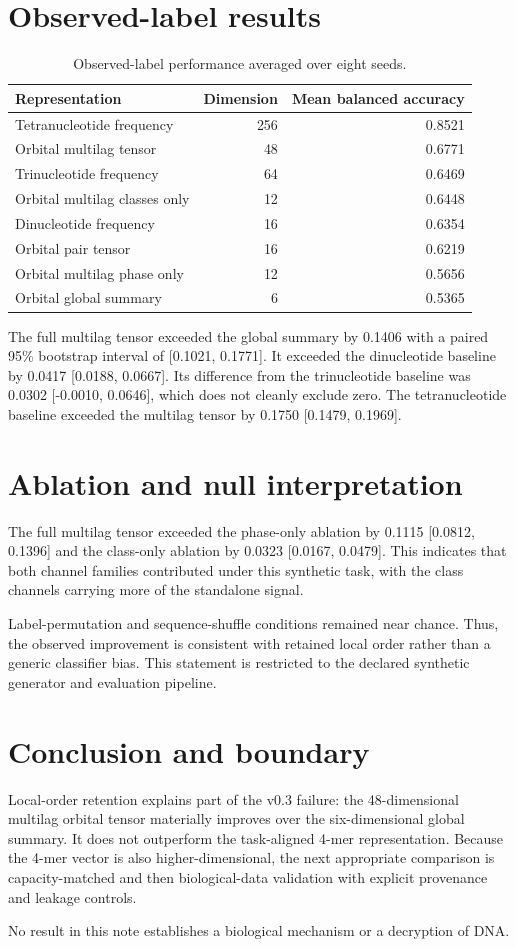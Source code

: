 \documentclass[11pt]{article}
\begin{document}
\section{Observed-label results}
\begin{table}[ht]
\centering
\begin{tabular}{lrr}
\toprule
Representation & Dimension & Mean balanced accuracy \\
\midrule
Tetranucleotide frequency & 256 & 0.8521 \\
Orbital multilag tensor & 48 & 0.6771 \\
Trinucleotide frequency & 64 & 0.6469 \\
Orbital multilag classes only & 12 & 0.6448 \\
Dinucleotide frequency & 16 & 0.6354 \\
Orbital pair tensor & 16 & 0.6219 \\
Orbital multilag phase only & 12 & 0.5656 \\
Orbital global summary & 6 & 0.5365 \\
\bottomrule
\end{tabular}
\caption{Observed-label performance averaged over eight seeds.}
\label{tab:observed}
\end{table}

The full multilag tensor exceeded the global summary by 0.1406 with a paired 95\% bootstrap interval of [0.1021, 0.1771]. It exceeded the dinucleotide baseline by 0.0417 [0.0188, 0.0667]. Its difference from the trinucleotide baseline was 0.0302 [-0.0010, 0.0646], which does not cleanly exclude zero. The tetranucleotide baseline exceeded the multilag tensor by 0.1750 [0.1479, 0.1969].

\section{Ablation and null interpretation}
The full multilag tensor exceeded the phase-only ablation by 0.1115 [0.0812, 0.1396] and the class-only ablation by 0.0323 [0.0167, 0.0479]. This indicates that both channel families contributed under this synthetic task, with the class channels carrying more of the standalone signal.

Label-permutation and sequence-shuffle conditions remained near chance. Thus, the observed improvement is consistent with retained local order rather than a generic classifier bias. This statement is restricted to the declared synthetic generator and evaluation pipeline.

\section{Conclusion and boundary}
Local-order retention explains part of the v0.3 failure: the 48-dimensional multilag orbital tensor materially improves over the six-dimensional global summary. It does not outperform the task-aligned 4-mer representation. Because the 4-mer vector is also higher-dimensional, the next appropriate comparison is capacity-matched and then biological-data validation with explicit provenance and leakage controls.

No result in this note establishes a biological mechanism or a decryption of DNA.
\end{document}
